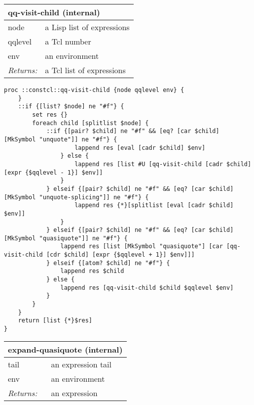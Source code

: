 \documentclass{report}
\begin{document}
\begin{tabular}{ |l l| }
\hline
\multicolumn{2}{|l|}{qq-visit-child (internal)} \\
\hline
node & a Lisp list of expressions \\
qqlevel & a Tcl number \\
env & an environment \\
\textit{Returns:} & a Tcl list of expressions \\
\hline
\end{tabular}

\noindent\makebox[\linewidth]{\rule{\linewidth}{0.4pt}}
\begin{lstlisting}
proc ::constcl::qq-visit-child {node qqlevel env} {
    }
    ::if {[list? $node] ne "#f"} {
        set res {}
        foreach child [splitlist $node] {
            ::if {[pair? $child] ne "#f" && [eq? [car $child] [MkSymbol "unquote"]] ne "#f"} {
                    lappend res [eval [cadr $child] $env]
                } else {
                    lappend res [list #U [qq-visit-child [cadr $child] [expr {$qqlevel - 1}] $env]]
                }
            } elseif {[pair? $child] ne "#f" && [eq? [car $child] [MkSymbol "unquote-splicing"]] ne "#f"} {
                    lappend res {*}[splitlist [eval [cadr $child] $env]]
                }
            } elseif {[pair? $child] ne "#f" && [eq? [car $child] [MkSymbol "quasiquote"]] ne "#f"} {
                lappend res [list [MkSymbol "quasiquote"] [car [qq-visit-child [cdr $child] [expr {$qqlevel + 1}] $env]]] 
            } elseif {[atom? $child] ne "#f"} {
                lappend res $child
            } else {
                lappend res [qq-visit-child $child $qqlevel $env]
            }
        }
    }
    return [list {*}$res]
}
\end{lstlisting}
\noindent\makebox[\linewidth]{\rule{\linewidth}{0.4pt}}
\begin{tabular}{ |l l| }
\hline
\multicolumn{2}{|l|}{expand-quasiquote (internal)} \\
\hline
tail & an expression tail \\
env & an environment \\
\textit{Returns:} & an expression \\
\hline
\end{tabular}
\end{document}
